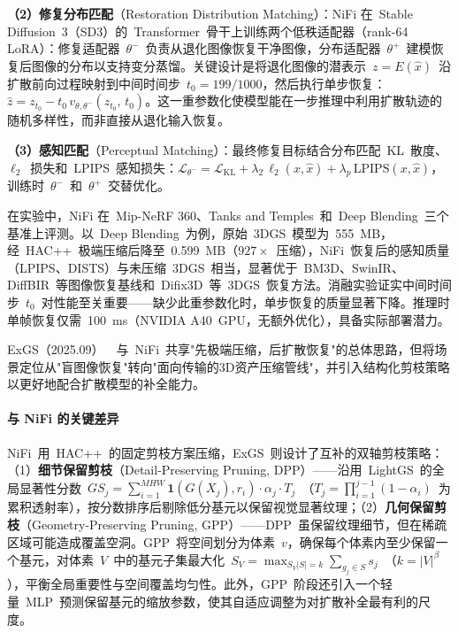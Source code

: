 \textbf{（2）修复分布匹配}（Restoration Distribution Matching）：NiFi 在~Stable Diffusion~3（SD3）的~Transformer~骨干上训练两个低秩适配器（rank-64 LoRA）：修复适配器~$\theta^-$~负责从退化图像恢复干净图像，分布适配器~$\theta^+$~建模恢复后图像的分布以支持变分蒸馏。关键设计是将退化图像的潜表示~$z = E(\hat{x})$~沿扩散前向过程映射到中间时间步~$t_0 = 199/1000$，然后执行单步恢复：$\hat{z} = z_{t_0} - t_0 \, v_{\theta, \theta^-}(z_{t_0},\, t_0)$。这一重参数化使模型能在一步推理中利用扩散轨迹的随机多样性，而非直接从退化输入恢复。

\textbf{（3）感知匹配}（Perceptual Matching）：最终修复目标结合分布匹配~KL~散度、$\ell_2$~损失和~LPIPS~感知损失：$\mathcal{L}_{\theta^-} = \mathcal{L}_{\mathrm{KL}} + \lambda_2 \,\ell_2(x, \hat{x}) + \lambda_p \,\mathrm{LPIPS}(x, \hat{x})$，训练时~$\theta^-$~和~$\theta^+$~交替优化。

在实验中，NiFi 在~Mip-NeRF 360、Tanks and Temples~和~Deep Blending~三个基准上评测。以~Deep Blending~为例，原始~3DGS~模型为~555~MB，经~HAC++~极端压缩后降至~0.599~MB（$927\times$~压缩），NiFi~恢复后的感知质量（LPIPS、DISTS）与未压缩~3DGS~相当，显著优于~BM3D、SwinIR、DiffBIR~等图像恢复基线和~Difix3D~等~3DGS~恢复方法。消融实验证实中间时间步~$t_0$~对性能至关重要——缺少此重参数化时，单步恢复的质量显著下降。推理时单帧恢复仅需~100~ms（NVIDIA A40~GPU，无额外优化），具备实际部署潜力。

ExGS（2025.09）~\cite{2509_24758}~与~NiFi~共享"先极端压缩，后扩散恢复"的总体思路，但将场景定位从"盲图像恢复"转向"面向传输的3D资产压缩管线"，并引入结构化剪枝策略以更好地配合扩散模型的补全能力。

\paragraph{与 NiFi 的关键差异}

NiFi~用~HAC++~的固定剪枝方案压缩，ExGS~则设计了互补的双轴剪枝策略：（1）\textbf{细节保留剪枝}（Detail-Preserving Pruning, DPP）——沿用~LightGS~的全局显著性分数~$GS_j = \sum_{i=1}^{MHW} \mathbf{1}(G(X_j), r_i) \cdot \alpha_j \cdot T_j$~（$T_j = \prod_{i=1}^{j-1}(1-\alpha_i)$~为累积透射率），按分数排序后剔除低分基元以保留视觉显著纹理；（2）\textbf{几何保留剪枝}（Geometry-Preserving Pruning, GPP）——DPP~虽保留纹理细节，但在稀疏区域可能造成覆盖空洞。GPP~将空间划分为体素~$v$，确保每个体素内至少保留一个基元，对体素~$V$~中的基元子集最大化~$S_V = \max_{S_V |S|=k} \sum_{g_j \in S} s_j$~（$k=|V|^\beta$），平衡全局重要性与空间覆盖均匀性。此外，GPP~阶段还引入一个轻量~MLP~预测保留基元的缩放参数，使其自适应调整为对扩散补全最有利的尺度。


